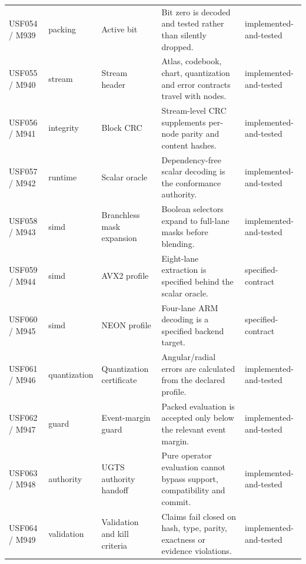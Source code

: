 \documentclass[11pt,a4paper]{article}
\begin{document}
\begin{longtable}{P{20mm}P{15mm}P{28mm}P{70mm}P{20mm}}
USF054 / M939 & packing & Active bit & Bit zero is decoded and tested rather than silently dropped. & implemented-and-tested \\
USF055 / M940 & stream & Stream header & Atlas, codebook, chart, quantization and error contracts travel with nodes. & implemented-and-tested \\
USF056 / M941 & integrity & Block CRC & Stream-level CRC supplements per-node parity and content hashes. & implemented-and-tested \\
USF057 / M942 & runtime & Scalar oracle & Dependency-free scalar decoding is the conformance authority. & implemented-and-tested \\
USF058 / M943 & simd & Branchless mask expansion & Boolean selectors expand to full-lane masks before blending. & implemented-and-tested \\
USF059 / M944 & simd & AVX2 profile & Eight-lane extraction is specified behind the scalar oracle. & specified-contract \\
USF060 / M945 & simd & NEON profile & Four-lane ARM decoding is a specified backend target. & specified-contract \\
USF061 / M946 & quantization & Quantization certificate & Angular/radial errors are calculated from the declared profile. & implemented-and-tested \\
USF062 / M947 & guard & Event-margin guard & Packed evaluation is accepted only below the relevant event margin. & implemented-and-tested \\
USF063 / M948 & authority & UGTS authority handoff & Pure operator evaluation cannot bypass support, compatibility and commit. & implemented-and-tested \\
USF064 / M949 & validation & Validation and kill criteria & Claims fail closed on hash, type, parity, exactness or evidence violations. & implemented-and-tested \\
\end{longtable}
\normalsize
\end{document}
